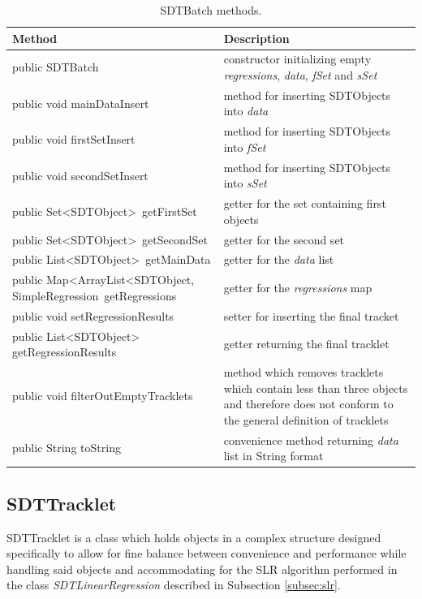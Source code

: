 \begin{table}[H]
\centering
\setlength{\extrarowheight}{2pt}
\begin{tabularx}{\textwidth}{|X|X|}
\hline
\textbf{Method} & \textbf{Description} \\ \hline
public \mbox{SDTBatch} & constructor initializing empty \emph{regressions}, \emph{data}, \emph{fSet} and \emph{sSet} \\ \hline
public void \mbox{mainDataInsert} & method for inserting \mbox{SDTObjects} into \emph{data} \\ \hline
public void \mbox{firstSetInsert} & method for inserting \mbox{SDTObjects} into \emph{fSet} \\ \hline
public void \mbox{secondSetInsert} & method for inserting \mbox{SDTObjects} into \emph{sSet} \\ \hline
public \mbox{Set<SDTObject> getFirstSet} & getter for the set containing first objects \\ \hline
public \mbox{Set<SDTObject> getSecondSet} & getter for the second set \\ \hline
public \mbox{List<SDTObject> getMainData} & getter for the \emph{data} list \\ \hline
public \mbox{Map<ArrayList<SDTObject,} \mbox{SimpleRegression getRegressions} & getter for the \emph{regressions} map \\ \hline
public void \mbox{setRegressionResults} & setter for inserting the final tracket \\ \hline
public \mbox{List<SDTObject>} \mbox{getRegressionResults} & getter returning the final tracklet \\ \hline
public void \mbox{filterOutEmptyTracklets} & method which removes tracklets which contain less than three objects and therefore does not conform to the general definition of tracklets \\ \hline
public String \mbox{toString} & convenience method returning \emph{data} list in String format \\ \hline
\end{tabularx}
\caption{SDTBatch methods.}
\label{tab:class_methods_B}
\end{table}

\newpage

\subsection{SDTTracklet}\label{subsec:tracklet}

	SDTTracklet is a class which holds objects in a complex structure designed specifically to allow for fine balance between convenience and performance while handling said objects and accommodating for the SLR algorithm performed in the class \emph{SDTLinearRegression} described in Subsection \ref{subsec:slr}.
	
